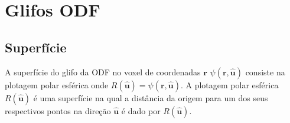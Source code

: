 \documentclass[
    12pt,                %
    oneside,            %
    a4paper,            %
    english,            %
    french,                %
    spanish,            %
    brazil                %
    ]{abntex2}
\begin{document}



\section{Glifos ODF}
\label{sec::glifos_odf}

\subsection{Superfície}

A superfície do glifo da ODF no voxel de coordenadas $\mathbf{r}$ $\psi(\mathbf{r}, \mathbf{\hat{u}})$ consiste na plotagem polar esférica onde $R(\mathbf{\hat{u}}) = \psi(\mathbf{r}, \mathbf{\hat{u}})$. A plotagem polar esférica $R(\mathbf{\hat{u}})$ é uma superfície na qual a distância da origem para um dos seus respectivos pontos na direção $\mathbf{\hat{u}}$ é dado por $R(\mathbf{\hat{u}})$.

\end{document}
